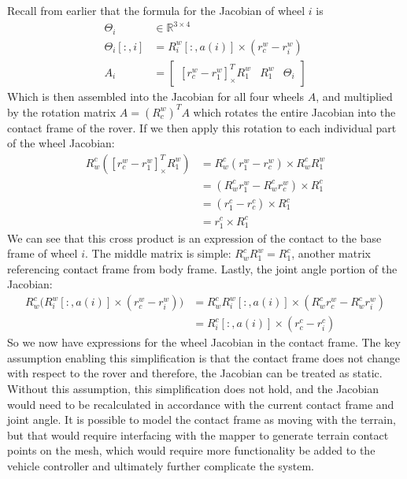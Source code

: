 \documentclass[12pt]{article}
\begin{document}
Recall from earlier that the formula for the Jacobian of wheel $i$ is 
\begin{align}
    \Theta_i &\in \mathbb{R}^{3 \times 4}\\
    \Theta_i[:, i] &= R^w_i[:, a(i)] \times (r^w_c - r^w_i)\\
    A_i &= \begin{bmatrix}
    [r^w_c - r^w_1]_{\times}^T R^w_1 & R^w_1 & \Theta_i 
    \end{bmatrix}
\end{align}
Which is then assembled into the Jacobian for all four wheels $A$, and multiplied by the rotation matrix $A = (R_c^w)^T A$ which rotates the entire Jacobian into the contact frame of the rover. 
If we then apply this rotation to each individual part of the wheel Jacobian:
\begin{align}
    R_w^c \left( [r^w_c - r^w_1]^T_{\times} R^w_1 \right) &= R^c_w (r_1^w - r^w_c) \times R^c_w R_1^w \\
    &= (R_w^c r_1^w - R_w^c r_c^w) \times R^c_1 \\
    &= (r^c_1 - r^c_c) \times R^c_1 \\
    &= r^c_1 \times R_1^c
\end{align}
We can see that this cross product is an expression of the contact to the base frame of wheel $i$. 
The middle matrix is simple: $R_w^c R^w_1 = R^c_1$, another matrix referencing contact frame from body frame. 
Lastly, the joint angle portion of the Jacobian:
\begin{align}
    R^c_w \Big(R_i^w[:, a(i)] \times (r_c^w - r^w_i)\Big) &= R_w^c R_i^w[:, a(i)] \times (R_w^c r_c^w - R_w^c r_i^w) \\
    &= R^c_i[:, a(i)] \times (r^c_c - r^c_i)
\end{align}
So we now have expressions for the wheel Jacobian in the contact frame. 
The key assumption enabling this simplification is that the contact frame does not change with respect to the rover and therefore, the Jacobian can be treated as static. 
Without this assumption, this simplification does not hold, and the Jacobian would need to be recalculated in accordance with the current contact frame and joint angle. 
It is possible to model the contact frame as moving with the terrain, but that would require interfacing with the mapper to generate terrain contact points on the mesh, which would require more functionality be added to the vehicle controller and ultimately further complicate the system. 



\end{document}
